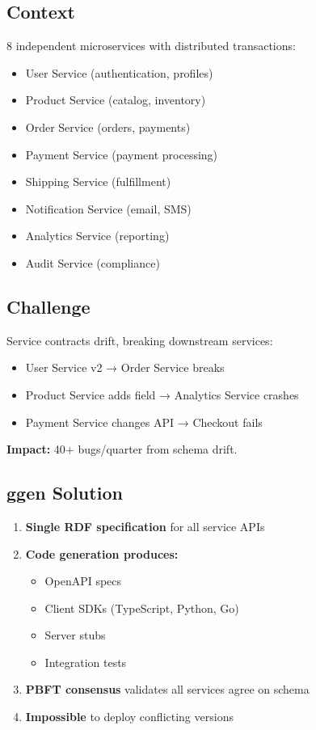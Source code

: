 \subsection{Context}

8 independent microservices with distributed transactions:
\begin{itemize}
    \item User Service (authentication, profiles)
    \item Product Service (catalog, inventory)
    \item Order Service (orders, payments)
    \item Payment Service (payment processing)
    \item Shipping Service (fulfillment)
    \item Notification Service (email, SMS)
    \item Analytics Service (reporting)
    \item Audit Service (compliance)
\end{itemize}

\subsection{Challenge}

Service contracts drift, breaking downstream services:
\begin{itemize}
    \item User Service v2 → Order Service breaks
    \item Product Service adds field → Analytics Service crashes
    \item Payment Service changes API → Checkout fails
\end{itemize}

\textbf{Impact:} 40+ bugs/quarter from schema drift.

\subsection{ggen Solution}

\begin{enumerate}
    \item \textbf{Single RDF specification} for all service APIs
    \item \textbf{Code generation produces:}
        \begin{itemize}
            \item OpenAPI specs
            \item Client SDKs (TypeScript, Python, Go)
            \item Server stubs
            \item Integration tests
        \end{itemize}
    \item \textbf{PBFT consensus} validates all services agree on schema
    \item \textbf{Impossible} to deploy conflicting versions
\end{enumerate}

